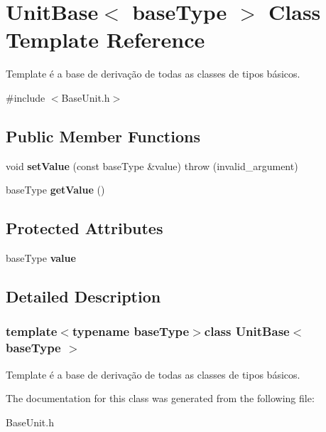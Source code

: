 \hypertarget{classUnitBase}{\section{Unit\-Base$<$ base\-Type $>$ Class Template Reference}
\label{classUnitBase}
}


Template é a base de derivação de todas as classes de tipos básicos.  




{\ttfamily \#include $<$Base\-Unit.\-h$>$}

\subsection*{Public Member Functions}
\begin{DoxyCompactItemize}
\item 
\hypertarget{classUnitBase_af14e2453bc9870f0e04514799585e763}{void {\bfseries set\-Value} (const base\-Type \&value)  throw (invalid\-\_\-argument)}\label{classUnitBase_af14e2453bc9870f0e04514799585e763}

\item 
\hypertarget{classUnitBase_a620b2e9bda880c77d98a3c4cafb8443f}{base\-Type {\bfseries get\-Value} ()}\label{classUnitBase_a620b2e9bda880c77d98a3c4cafb8443f}

\end{DoxyCompactItemize}
\subsection*{Protected Attributes}
\begin{DoxyCompactItemize}
\item 
\hypertarget{classUnitBase_a1c1ad08b45f07a94e5cf71dee734436b}{base\-Type {\bfseries value}}\label{classUnitBase_a1c1ad08b45f07a94e5cf71dee734436b}

\end{DoxyCompactItemize}


\subsection{Detailed Description}
\subsubsection*{template$<$typename base\-Type$>$class Unit\-Base$<$ base\-Type $>$}

Template é a base de derivação de todas as classes de tipos básicos. 

The documentation for this class was generated from the following file\-:\begin{DoxyCompactItemize}
\item 
Base\-Unit.\-h\end{DoxyCompactItemize}
